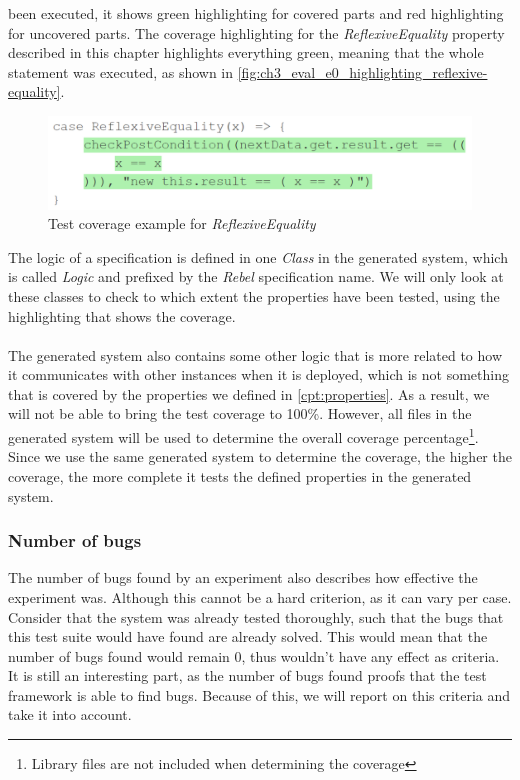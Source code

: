 been executed, it shows green highlighting for covered parts and red
highlighting for uncovered parts. The coverage highlighting for the
\textit{ReflexiveEquality} property described in this chapter highlights
everything green, meaning that the whole statement was executed, as shown in
\autoref{fig:ch3_eval_e0_highlighting_reflexive-equality}.
\begin{figure}[!ht]
	\includegraphics[width=\linewidth]{figures/e0_coverage_property_sample}
\caption{Test coverage example for \textit{ReflexiveEquality}}
\label{fig:ch3_eval_e0_highlighting_reflexive-equality}
\centering
\end{figure}
\FloatBarrier\noindent
The logic of a specification is defined in one \textit{Class} in the generated
system, which is called \textit{Logic} and prefixed by the \textit{Rebel}
specification name. We will only look at these classes to check to which extent
the properties have been tested, using the highlighting that shows the
coverage.\\
\\
The generated system also contains some other logic that is more related to how
it communicates with other instances when it is deployed, which is not something
that is covered by the properties we defined in \autoref{cpt:properties}. As a
result, we will not be able to bring the test coverage to 100\%. However, all
files in the generated system will be used to determine the overall coverage
percentage\footnote{Library files are not included when determining the coverage}.
Since we use the same generated system to determine the coverage, the higher the
coverage, the more complete it tests the defined properties in the generated
system.

\subsubsection{Number of bugs}
The number of bugs found by an experiment also describes how effective the
experiment was. Although this cannot be a hard criterion, as it can vary per
case. Consider that the system was already tested thoroughly, such that the bugs
that this test suite would have found are already solved. This would mean that
the number of bugs found would remain 0, thus wouldn't have any effect as
criteria. It is still an interesting part, as the number of bugs found proofs
that the test framework is able to find bugs. Because of this, we will report on
this criteria and take it into account.

